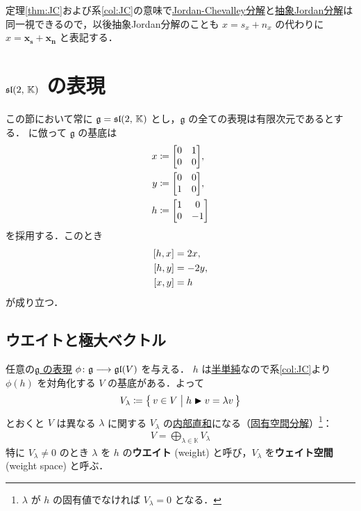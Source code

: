 \documentclass[rep_main]{subfiles}
\begin{document}
\begin{marker}
	定理\ref{thm:JC}および系\ref{col:JC}の意味で\hyperref[prop:Jordan-Chevalley]{Jordan-Chevalley分解}と\hyperref[def:abstruct-JC]{抽象Jordan分解}は同一視できるので，以後抽象Jordan分解のことも $x = s_x + n_x$ の代わりに $x = \bm{x_s} + \bm{x_n}$ と表記する．
\end{marker}


\section{$\mathfrak{sl}(2,\, \mathbb{K})$ の表現}

この節において常に $\mathfrak{g} = \mathfrak{sl}(2,\, \mathbb{K})$ とし，$\mathfrak{g}$ の全ての表現は有限次元であるとする．
に倣って $\mathfrak{g}$ の基底は
\begin{align}
	x &\coloneqq \mqty[0 & 1 \\ 0 & 0], \\
	y &\coloneqq \mqty[0 & 0 \\ 1 & 0], \\
	h &\coloneqq \mqty[1 & 0 \\ 0 & -1]
\end{align}
を採用する．このとき
\begin{align}
	\label{eq:sl2}
	\comm{h}{x} &= 2x, \\
	\comm{h}{y} &= -2y, \\
	\comm{x}{y} &= h
\end{align}
が成り立つ．

\subsection{ウエイトと極大ベクトル}

任意の\hyperref[ax:g-module]{$\mathfrak{g}$ の表現} $\phi \colon \mathfrak{g} \longrightarrow \mathfrak{gl}(V)$ を与える．
$h$ は\hyperref[def:semisimple-end]{半単純}なので系\ref{col:JC}より $\phi(h)$ を対角化する $V$ の基底がある．よって
\begin{align}
	\label{def:weight-space}
	V_\lambda \coloneqq \bigl\{\, v \in V \bigm| h \blacktriangleright v = \lambda v \,\bigr\} 
\end{align}
とおくと $V$ は異なる $\lambda$ に関する $V_\lambda$ の\hyperref[prop:subvec-directsum]{内部直和}になる（\hyperref[thm:eigen-decomp1]{固有空間分解}）\footnote{$\lambda$ が $h$ の固有値でなければ $V_\lambda = 0$ となる．}：
\begin{align}
	\label{def:weight-space-decomp}
	V = \bigoplus_{\lambda \in \mathbb{K}} V_\lambda
\end{align}
特に $V_\lambda \neq 0$ のとき $\lambda$ を $h$ の\textbf{ウエイト} (weight) と呼び，$V_\lambda$ を\textbf{ウェイト空間} (weight space) と呼ぶ．
\end{document}
